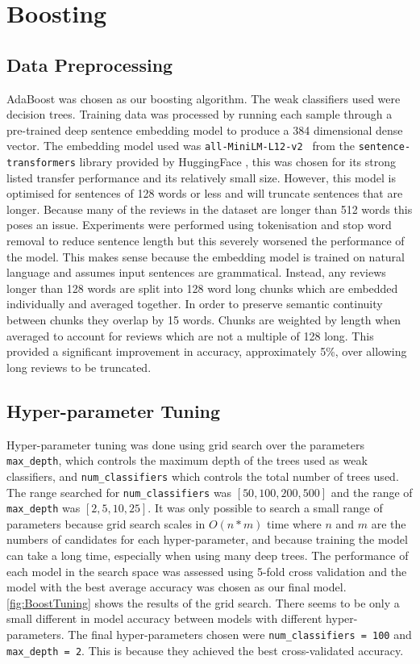


\section{Boosting}
\subsection{Data Preprocessing}
AdaBoost was chosen as our boosting algorithm. The weak classifiers used were decision trees. Training data was processed by running each sample through a pre-trained deep sentence embedding model to produce a 384 dimensional dense vector. The embedding model used was \verb|all-MiniLM-L12-v2 | from the \verb|sentence-transformers| library provided by HuggingFace \cite{HuggingFace}, this was chosen for its strong listed transfer performance and its relatively small size. However, this model is optimised for sentences of 128 words or less and will truncate sentences that are longer. Because many of the reviews in the dataset are longer than 512 words this poses an issue. Experiments were performed using tokenisation and stop word removal to reduce sentence length but this severely worsened the performance of the model. This makes sense because the embedding model is trained on natural language and assumes input sentences are grammatical. Instead, any reviews longer than 128 words are split into 128 word long chunks which are embedded individually and averaged together. In order to preserve semantic continuity between chunks they overlap by 15 words. Chunks are weighted by length when averaged to account for reviews which are not a multiple of 128 long. This provided a significant improvement in accuracy, approximately 5\%,  over allowing long reviews to be truncated.

\subsection{Hyper-parameter Tuning}
Hyper-parameter tuning was done using grid search over the parameters \verb|max_depth|, which controls the maximum depth of the trees used as weak classifiers, and \verb|num_classifiers| which controls the total number of trees used. The range searched for \verb|num_classifiers| was $[50, 100, 200, 500]$ and the range of \verb|max_depth| was $[2, 5, 10, 25]$. It was only possible to search a small range of parameters because grid search scales in $O(n*m)$ time where $n$ and $m$ are the numbers of candidates for each hyper-parameter, and because training the model can take a long time, especially when using many deep trees. The performance of each model in the search space was assessed using 5-fold cross validation and the model with the best average accuracy was chosen as our final model. \autoref{fig:BoostTuning} shows the results of the grid search. There seems to be only a small different in model accuracy between models with different hyper-parameters. The final hyper-parameters chosen were \verb|num_classifiers = 100| and \verb|max_depth = 2|. This is because they achieved the best cross-validated accuracy. 

